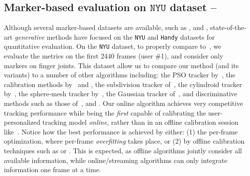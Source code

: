 

\subsection{Marker-based evaluation on $\texttt{NYU}$ dataset --
}
\label{sec:evalnyu}
Although several marker-based datasets are available, such as \cite{qian2014realtime}, \cite{sharp2015accurate} and \cite{yuan2017bighand}, state-of-the-art \emph{generative} methods have focused on the \texttt{NYU} \cite{tompson2014real} and \texttt{Handy} \cite{tkach2016sphere} datasets for quantitative evaluation. 
On the \texttt{NYU} dataset, to properly compare to~, we evaluate the metrics on the first 2440 frames (user \#1), and consider only markers on finger joints.
%
This dataset allow us to compare our method (and its variants) to a number of other algorithms including: the PSO tracker by~, the calibration methods by~ and , the subdivision tracker of~, the cylindroid tracker by~, the sphere-mesh tracker by~, the Gaussian tracker of~, and discriminative methods such as those of~,  and . 
% 
% 
Our online algorithm achieves very competitive tracking performance while being the \emph{first} capable of calibrating the user-personalized tracking model \emph{online}, rather than in an offline calibration session like~. 
% 
Notice how the best performance is achieved by either: (1) the per-frame optimization, where per-frame \emph{overfitting} takes place, or (2) by offline calibration techniques such as \OfflineSoft{} or \cite{taylor2016joint}. This is expected, as offline algorithms jointly consider all available information, while online/streaming algorithms can only integrate information one frame at a time.

